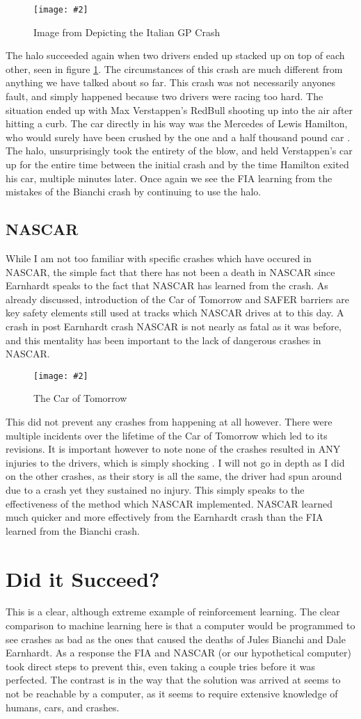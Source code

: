 \documentclass[letterpaper, 12pt]{article}
\numberwithin{figure}{section}
\newcommand{\figref}[4]
{
  \begin{figure}[H]
    \centering
    \texttt{[image: \#2]}
    \caption{#3}
    #4
  \end{figure}
}
\begin{document}
\figref{8}{monza.jpg}{Image from \cite{rayson_2021} Depicting the Italian GP Crash}{\label{fig:3}}
The halo succeeded again when two drivers ended up stacked up on top of each other, seen in figure \ref{fig:3}. The circumstances of this crash are much different from anything we have talked about so far. This crash was not necessarily anyones fault, and simply happened because two drivers were racing too hard. The situation ended up with Max Verstappen's RedBull shooting up into the air after hitting a curb. The car directly in his way was the Mercedes of Lewis Hamilton, who would surely have been crushed by the one and a half thousand pound car \cite{rayson_2021}. The halo, unsurprisingly took the entirety of the blow, and held Verstappen's car up for the entire time between the initial crash and by the time Hamilton exited his car, multiple minutes later. Once again we see the FIA learning from the mistakes of the Bianchi crash by continuing to use the halo.

\subsection{NASCAR}
While I am not too familiar with specific crashes which have occured in NASCAR, the simple fact that there has not been a death in NASCAR since Earnhardt speaks to the fact that NASCAR has learned from the crash. As already discussed, introduction of the Car of Tomorrow and SAFER barriers are key safety elements still used at tracks which NASCAR drives at to this day. A crash in post Earnhardt crash NASCAR is not nearly as fatal as it was before, and this mentality has been important to the lack of dangerous crashes in NASCAR.

\figref{8}{cot}{The Car of Tomorrow}{\label{fig:4}}
This did not prevent any crashes from happening at all however. There were multiple incidents over the lifetime of the Car of Tomorrow which led to its revisions. It is important however to note none of the crashes resulted in ANY injuries to the drivers, which is simply shocking \cite{nascar.com_2010}. I will not go in depth as I did on the other crashes, as their story is all the same, the driver had spun around due to a crash yet they sustained no injury. This simply speaks to the effectiveness of the method which NASCAR implemented. NASCAR learned much quicker and more effectively from the Earnhardt crash than the FIA learned from the Bianchi crash. 

\section{Did it Succeed?}
This is a clear, although extreme example of reinforcement learning. The clear comparison to machine learning here is that a computer would be programmed to see crashes as bad as the ones that caused the deaths of Jules Bianchi and Dale Earnhardt. As a response the FIA and NASCAR (or our hypothetical computer) took direct steps to prevent this, even taking a couple tries before it was perfected. The contrast is in the way that the solution was arrived at seems to not be reachable by a computer, as it seems to require extensive knowledge of humans, cars, and crashes.
\end{document}
